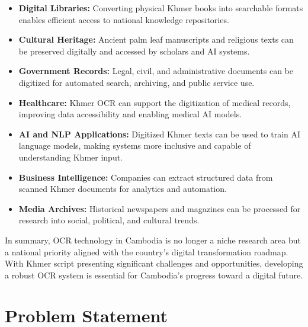 \begin{itemize}
    \item \textbf{Digital Libraries:} Converting physical Khmer books into searchable formats enables efficient access to national knowledge repositories.
    
    \item \textbf{Cultural Heritage:} Ancient palm leaf manuscripts and religious texts can be preserved digitally and accessed by scholars and AI systems.
    
    \item \textbf{Government Records:} Legal, civil, and administrative documents can be digitized for automated search, archiving, and public service use.
    
    \item \textbf{Healthcare:} Khmer OCR can support the digitization of medical records, improving data accessibility and enabling medical AI models.
    
    \item \textbf{AI and NLP Applications:} Digitized Khmer texts can be used to train AI language models, making systems more inclusive and capable of understanding Khmer input.
    
    \item \textbf{Business Intelligence:} Companies can extract structured data from scanned Khmer documents for analytics and automation.
    
    \item \textbf{Media Archives:} Historical newspapers and magazines can be processed for research into social, political, and cultural trends.
\end{itemize}

In summary, OCR technology in Cambodia is no longer a niche research area but a national priority aligned with the country’s digital transformation roadmap. With Khmer script presenting significant challenges and opportunities, developing a robust OCR system is essential for Cambodia’s progress toward a digital future.



\section{Problem Statement}
\label{sec:problem}

